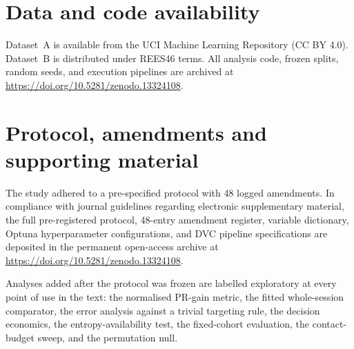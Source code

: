 \documentclass[a4paper]{article}
\begin{document}
\section*{Data and code availability}
Dataset~A is available from the UCI Machine Learning Repository (CC BY 4.0).
Dataset~B is distributed under REES46 terms. All analysis code, frozen splits, random
seeds, and execution pipelines are archived at \url{https://doi.org/10.5281/zenodo.13324108}.

\appendix
\section{Protocol, amendments and supporting material}
\label{app:alignment}

The study adhered to a pre-specified protocol with 48 logged amendments. In compliance
with journal guidelines regarding electronic supplementary material, the full
pre-registered protocol, 48-entry amendment register, variable dictionary, Optuna
hyperparameter configurations, and DVC pipeline specifications are deposited in the
permanent open-access archive at \url{https://doi.org/10.5281/zenodo.13324108}.

Analyses added after the protocol was frozen are labelled exploratory at every point
of use in the text: the normalised PR-gain metric, the fitted whole-session comparator,
the error analysis against a trivial targeting rule, the decision economics, the
entropy-availability test, the fixed-cohort evaluation, the contact-budget sweep,
and the permutation null.



\end{document}
